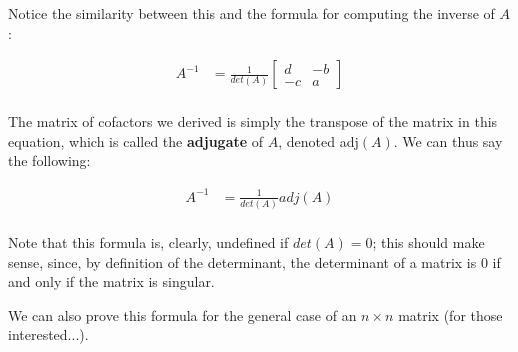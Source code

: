 \documentclass[12pt]{article}
\begin{document}
Notice the similarity between this and the formula for computing the inverse of $A$:

\begin{equation}
    \begin{split}
    A^{-1} &= \frac{1}{det(A)}\begin{bmatrix}
       d & -b\\
        -c & a
    \end{bmatrix}\\
    \end{split}
\end{equation}

The matrix of cofactors we derived is simply the transpose of the matrix in this equation, which is called the \textbf{adjugate} of $A$, denoted adj$(A)$. We can thus say the following:

\begin{equation}
    \begin{split}
    A^{-1} &= \frac{1}{det(A)}adj(A)\\
    \end{split}
\end{equation}

Note that this formula is, clearly, undefined if $det(A) = 0$; this should make sense, since, by definition of the determinant, the determinant of a matrix is 0 if and only if the matrix is singular.

We can also prove this formula for the general case of an $n \times n$ matrix (for those interested...).

\renewcommand{\qedsymbol}{$\blacksquare$}
\end{document}
